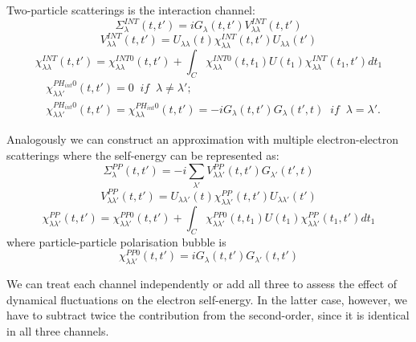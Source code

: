 Two-particle scatterings is the interaction channel:
\begin{equation}
\Sigma_{\lambda}^{INT}(t,t')=i G_{\lambda}(t,t') V_{\lambda \lambda}^{INT}(t,t')
\end{equation}
\begin{equation}
V_{\lambda \lambda}^{INT}(t,t')=U_{\lambda \lambda}(t) \chi_{\lambda \lambda}^{INT}(t,t')U_{\lambda \lambda}(t')
\end{equation}
\begin{equation}
\chi_{\lambda \lambda}^{INT}(t,t')=\chi_{\lambda \lambda}^{INT0}(t,t')+\int_C{\chi_{\lambda \lambda}^{INT0}(t,t_1)U(t_1)\chi_{\lambda \lambda}^{INT}(t_1,t') dt_1}
\end{equation}
\begin{equation}
\begin{split}
&{\chi_{\lambda \lambda'}^{PH_{int}0}(t,t')=0 \; \; if \; \; \lambda \ne \lambda'};\\
&{\chi_{\lambda \lambda'}^{PH_{int}0}(t,t')=\chi_{\lambda \lambda}^{PH_{int}0}(t,t')=-iG_{\lambda}(t,t')G_{\lambda}(t',t) \; \; if \; \; \lambda=\lambda'}.
\end{split}
\end{equation}

Analogously we can construct an approximation with multiple electron-electron scatterings where the self-energy can be represented as:
\begin{equation}
\Sigma_{\lambda}^{PP}(t,t')=-i\sum_{\lambda'}V_{\lambda \lambda'}^{PP}(t,t')G_{\lambda'}(t',t)
\end{equation}
\begin{equation}
V_{\lambda \lambda'}^{PP}(t,t')=U_{\lambda \lambda'}(t) \chi_{\lambda \lambda'}^{PP}(t,t')U_{\lambda \lambda'}(t')
\end{equation}
\begin{equation}
\chi_{\lambda \lambda'}^{PP}(t,t')=\chi_{\lambda \lambda'}^{PP0}(t,t')+\int_C{\chi_{\lambda \lambda'}^{PP0}(t,t_1)U(t_1)\chi_{\lambda \lambda'}^{PP}(t_1,t') dt_1}
\end{equation}
where particle-particle polarisation bubble is
\begin{equation}
\chi_{\lambda \lambda'}^{PP0}(t,t')=iG_{\lambda}(t,t')G_{\lambda'}(t,t')
\end{equation}

We can treat each channel independently or add all three to assess the effect of dynamical fluctuations on the electron self-energy.
In the latter case, however, we have to subtract twice the contribution from the second-order, since it is identical in all three channels.


